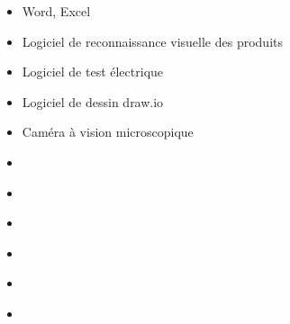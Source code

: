 \documentclass{article}
\renewcommand{\headrulewidth}{0pt} %
\renewcommand{\headrulewidth}{1pt} %
\renewcommand{\headrule}{\color{mainBlue}\hrule width\headwidth height\headrulewidth \vskip-\headrulewidth} %
\begin{document}
\begin{tabular}
\begin{itemize}
        \begin{itemize}
        [label={\textcolor{gray!80}{\checkmark}}, topsep=8pt, partopsep=0pt, itemsep=0.5pt, parsep=2pt,after=\vspace*{-\baselineskip}] 
            \item \textcolor{gray!80}{Word, Excel}
            \item \textcolor{gray!80}{Logiciel de reconnaissance visuelle des produits}
            \item \textcolor{gray!80}{Logiciel de test électrique}
            \item \textcolor{gray!80}{Logiciel de dessin draw.io}
            \item \textcolor{gray!80}{Caméra à vision microscopique}
            \item[\textcolor{white}{\checkmark}] \textcolor{gray!80}{} %
            \item[\textcolor{white}{\checkmark}] \textcolor{gray!80}{} %
            \item[\textcolor{white}{\checkmark}] \textcolor{gray!80}{} %
            \item[\textcolor{white}{\checkmark}] \textcolor{gray!80}{} %
            \item[\textcolor{white}{\checkmark}] \textcolor{gray!80}{} %
            \item[\textcolor{white}{\checkmark}] \textcolor{gray!80}{} %



        \end{itemize}
    \end{itemize}
\end{tabular}

\vfill %




\newpage

{
    \fancyhf{} 
    \fancyhead[L] %
    {
        \vspace*{10pt} %
        \textcolor{darkGray}{Dossier de compétences} 
    } 
    \fancyfoot[C]{\thepage\ / \pageref{LastPage}} %
    \renewcommand{\headrulewidth}{2pt} %
    \renewcommand{\headrule}{\color{mainBlue}\hrule width\headwidth height\headrulewidth \vskip-\headrulewidth} %
}
\end{document}
